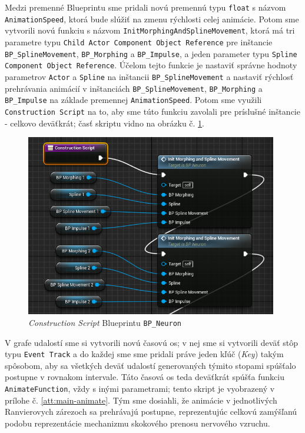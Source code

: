 Medzi premenné Blueprintu sme pridali novú premennú typu \texttt{float} s názvom \texttt{AnimationSpeed}, ktorá bude slúžiť na zmenu rýchlosti celej animácie. Potom sme vytvorili novú funkciu s názvom \texttt{InitMorphingAndSplineMovement}, ktorá má tri parametre typu \texttt{Child Actor Component Object Reference} pre inštancie \texttt{BP\_SplineMovement}, \texttt{BP\_Morphing} a \texttt{BP\_Impulse}, a jeden parameter typu 
\texttt{Spline Component Object Reference}. Účelom tejto funkcie je nastaviť správne hodnoty parametrov \texttt{Actor} a \texttt{Spline} na inštancii \texttt{BP\_SplineMovement} a nastaviť rýchlosť prehrávania animácií v inštanciách
\texttt{BP\_SplineMovement}, \texttt{BP\_Morphing} a \texttt{BP\_Impulse} na základe premennej \texttt{AnimationSpeed}. Potom sme využili \texttt{Construction Script} na to, aby sme túto funkciu zavolali pre príslušné inštancie - 
celkovo deväťkrát; časť skriptu vidno na obrázku č. \ref{constr-script}.

\begin{figure}[!htbp]
  \centering
  \includegraphics[width=11cm]{img/constr-script.png}
  \caption{\emph{Construction Script} Blueprintu \texttt{BP\_Neuron}}
  \label{constr-script}
\end{figure}

V grafe udalostí sme si vytvorili novú časovú os; v nej sme si vytvorili deväť stôp typu \texttt{Event Track} a do každej sme sme pridali práve jeden kľúč (\emph{Key}) takým spôsobom, aby sa všetkých deväť udalostí generovaných
týmito stopami spúšťalo postupne v rovnakom intervale. Táto časová os teda deväťkrát spúšťa funkciu \texttt{AnimateFunction}, vždy s inými parametrami; tento skript je vyobrazený v prílohe č. \ref{att:main-animate}.
Tým sme dosiahli, že animácie v jednotlivých Ranvierovych zárezoch sa prehrávajú postupne, reprezentujúc celkovú zamýšľanú podobu reprezentácie mechanizmu skokového prenosu nervového vzruchu.

